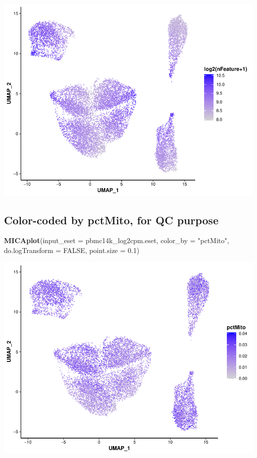 \documentclass[
  12pt,
]{book}
\newenvironment{Shaded}{\begin{snugshade}}{\end{snugshade}}
\newcommand{\AttributeTok}[1]{\textcolor[rgb]{0.13,0.29,0.53}{#1}}
\newcommand{\ConstantTok}[1]{\textcolor[rgb]{0.56,0.35,0.01}{#1}}
\newcommand{\FloatTok}[1]{\textcolor[rgb]{0.00,0.00,0.81}{#1}}
\newcommand{\FunctionTok}[1]{\textcolor[rgb]{0.13,0.29,0.53}{\textbf{#1}}}
\newcommand{\NormalTok}[1]{#1}
\newcommand{\StringTok}[1]{\textcolor[rgb]{0.31,0.60,0.02}{#1}}
\begin{document}
\begin{center}\includegraphics{_main_files/figure-latex/visualize-mica-output-nfeature-1} \end{center}

\subsection{Color-coded by pctMito, for QC purpose}\label{color-coded-by-pctmito-for-qc-purpose}

\begin{Shaded}
\begin{Highlighting}[]
\FunctionTok{MICAplot}\NormalTok{(}\AttributeTok{input\_eset =}\NormalTok{ pbmc14k\_log2cpm.eset, }\AttributeTok{color\_by =} \StringTok{"pctMito"}\NormalTok{, }\AttributeTok{do.logTransform =} \ConstantTok{FALSE}\NormalTok{, }\AttributeTok{point.size =} \FloatTok{0.1}\NormalTok{)}
\end{Highlighting}
\end{Shaded}

\begin{center}\includegraphics{_main_files/figure-latex/visualize-mica-output-pctmito-1} \end{center}
\end{document}
